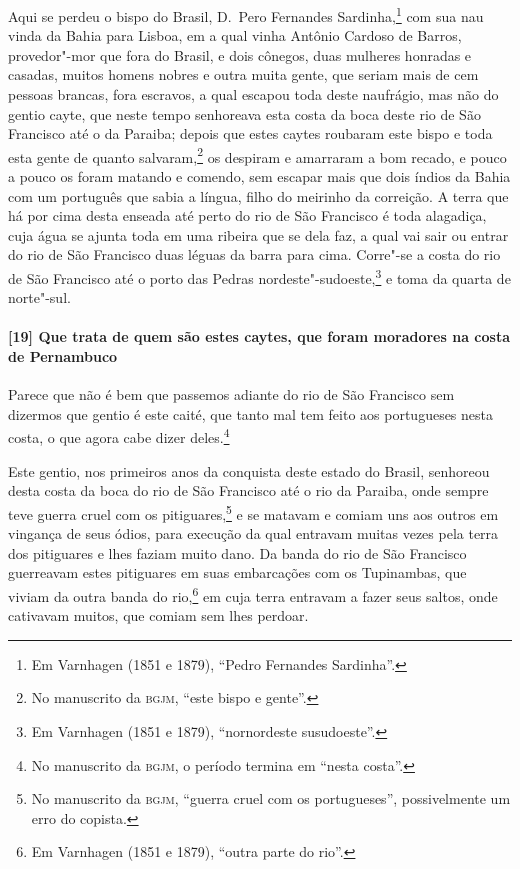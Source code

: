 \begin{linenumbers}
Aqui se perdeu o bispo do Brasil, D.~Pero Fernandes Sardinha,\footnote{ Em Varnhagen (1851
e 1879), ``Pedro Fernandes Sardinha''.} com sua nau vinda da Bahia para Lisboa, em a qual
vinha Antônio Cardoso de Barros, provedor"-mor que fora do Brasil, e dois cônegos, duas
mulheres honradas e casadas, muitos homens nobres e outra muita gente, que seriam mais de
cem pessoas brancas, fora escravos, a qual escapou toda deste naufrágio, mas não do gentio
cayte, que neste tempo senhoreava esta costa da boca deste rio de São Francisco até o da
Paraiba; depois que estes caytes roubaram este bispo e toda esta gente de quanto
salvaram,\footnote{ No manuscrito da \textsc{bgjm}, ``este bispo e gente''.} os despiram e
amarraram a bom recado, e pouco a pouco os foram matando e comendo, sem escapar mais que
dois índios da Bahia com um português que sabia a língua, filho do meirinho da correição.
A terra que há por cima desta enseada até perto do rio de São Francisco é toda alagadiça,
cuja água se ajunta toda em uma ribeira que se dela faz, a qual vai sair ou entrar do rio
de São Francisco duas léguas da barra para cima. Corre"-se a costa do rio de São Francisco
até o porto das Pedras nordeste"-sudoeste,\footnote{ Em Varnhagen (1851 e 1879),
``nornordeste susudoeste''.} e toma da quarta de norte"-sul.

\paragraph{[19] Que trata de quem são estes caytes, que foram moradores na costa de
Pernambuco} \quad
Parece que não é bem que passemos adiante do rio de São Francisco sem dizermos que gentio
é este caité, que tanto mal tem feito aos portugueses nesta costa, o que agora cabe dizer
deles.\footnote{ No manuscrito da \textsc{bgjm}, o período termina em ``nesta costa''.}

Este gentio, nos primeiros anos da conquista deste estado do Brasil, senhoreou desta costa
da boca do rio de São Francisco até o rio da Paraiba, onde sempre teve guerra cruel com os
pitiguares,\footnote{ No manuscrito da \textsc{bgjm}, ``guerra cruel com os portugueses'',
possivelmente um erro do copista.} e se matavam e comiam uns aos outros em vingança de
seus ódios, para execução da qual entravam muitas vezes pela terra dos pitiguares e lhes
faziam muito dano. Da banda do rio de São Francisco guerreavam estes pitiguares em suas
embarcações com os Tupinambas, que viviam da outra banda do rio,\footnote{ Em Varnhagen
(1851 e 1879), ``outra parte do rio''.} em cuja terra entravam a fazer seus saltos, onde
cativavam muitos, que comiam sem lhes perdoar.


\end{linenumbers}
